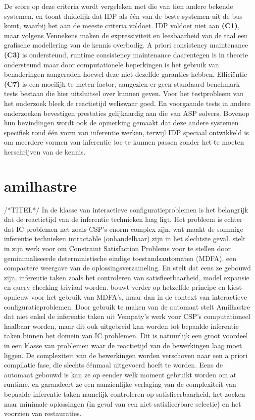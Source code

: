De score op deze criteria wordt vergeleken met die van tien andere bekende systemen, en toont duidelijk dat IDP als \'{e}\'{e}n van de beste systemen uit de bus komt, waarbij het aan de meeste criteria voldoet. IDP voldoet niet aan \textbf{(C1)}, maar volgens Vennekens maken de expressiviteit en leesbaarheid van de taal een grafische modellering van de kennis overbodig. 
A priori consistency maintenance \textbf{(C3)} is ondersteund, runtime consistency maintenance daarentegen is in theorie ondersteund maar door computationele beperkingen is het gebruik van benaderingen aangeraden hoewel deze niet dezelfde garanties hebben.
Effici\"{e}ntie \textbf{(C7)} is een moeilijk te meten factor, aangezien er geen standaard benchmark tests bestaan die hier uitsluitsel over kunnen geven. Voor het testprobleem van het onderzoek bleek de reactietijd weliswaar goed. En voorgaande tests in andere onderzoeken bevestigen prestaties gelijkaardig aan die van ASP solvers. 
Bovenop hun bevindingen wordt ook de opmerking gemaakt dat deze andere systemen specifiek rond \'{e}\'{e}n vorm van inferentie werken, terwijl IDP speciaal ontwikkeld is om meerdere vormen van inferentie toe te kunnen passen zonder het te moeten herschrijven van de kennis.

\section{amilhastre}
/*TITEL*/
In de klasse van interactieve configuratieproblemen is het belangrijk dat de reactietijd van de inferentie technieken laag ligt. Het probleem is echter dat IC problemen net zoals CSP's enorm complex zijn, wat maakt de sommige inferentie technieken intractable (onhandelbaar) zijn in het slechtste geval. \citep{vempaty1992solving} stelt in zijn werk voor om Constraint Satisfaction Problems voor te stellen door geminimaliseerde deterministische eindige toestandsautomaten (MDFA), een compactere weergave van de oplossingsverzameling. En stelt dat eens ze gebouwd zijn, inferentie taken zoals het controleren van satisfieerbaarheid, model expansie en query checking triviaal worden. \citep{amilhastre2002consistency} bouwt verder op hetzelfde principe en kiest opnieuw voor het gebruik van MDFA's, maar dan in de context van interactieve configuratieproblemen. Door gebruik te maken van de automaat stelt Amilhastre dat niet enkel de inferentie taken uit Vempaty's werk voor CSP's computationeel haalbaar worden, maar dit ook uitgebreid kan worden tot bepaalde inferentie taken binnen het domein van IC problemen. Dit is natuurlijk een groot voordeel in een klasse van problemen waar de reactietijd van de bewerkingen laag moet liggen. De complexiteit van de bewerkingen worden verschoven naar een a priori compilatie fase, die slechts \'{e}\'{e}nmaal uitgevoerd hoeft te worden. Eens de automaat gebouwd is kan ze op eender welk moment gebruikt worden om at runtime, en garandeert ze een aanzienlijke verlaging van de complexiteit van bepaalde inferentie taken namelijk controleren op satisfieerbaarheid, het zoeken naar minimale oplossingen (in geval van een niet-satisfieerbare selectie) en het voorzien van restauraties. 

